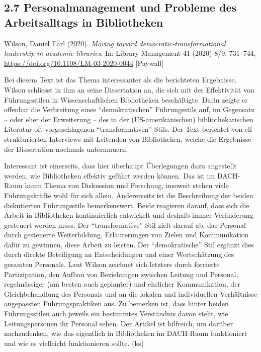 \documentclass[a4paper,
fontsize=11pt,
oneside,
numbers=noperiodatend,
parskip=half-,
bibliography=totoc,
final
]{scrartcl}
\begin{document}
\hypertarget{personalmanagement-und-probleme-des-arbeitsalltags-in-bibliotheken}{%
\subsection{2.7 Personalmanagement und Probleme des Arbeitsalltags in
Bibliotheken}\label{personalmanagement-und-probleme-des-arbeitsalltags-in-bibliotheken}}

Wilson, Daniel Earl (2020). \emph{Moving toward
democratic-transformational leadership in academic libraries}. In:
Library Management 41 (2020) 8/9, 731--744,
\url{https://doi.org/10.1108/LM-03-2020-0044} {[}Paywall{]}

Bei diesem Text ist das Thema interessanter als die berichteten
Ergebnisse. Wilson schliesst in ihm an seine Dissertation an, die sich
mit der Effektivität von Führungsstilen in Wissenschaftlichen
Bibliotheken beschäftigte. Darin zeigte er offenbar die Verbreitung
eines \enquote{demokratischen} Führungsstils auf, im Gegensatz -- oder
eher der Erweiterung -- des in der (US-amerikanischen)
bibliothekarischen Literatur oft vorgeschlagenen
\enquote{transformativen} Stils. Der Text berichtet von elf
strukturierten Interviews mit Leitenden von Bibliotheken, welche die
Ergebnisse der Dissertation nochmals untermauern.

Interessant ist einerseits, dass hier überhaupt Überlegungen dazu
angestellt werden, wie Bibliotheken effektiv geführt werden können. Das
ist im DACH-Raum kaum Thema von Diskussion und Forschung, insoweit
stehen viele Führungskräfte wohl für sich allein. Andererseits ist die
Beschreibung der beiden diskutierten Führungsstile bemerkenswert. Beide
reagieren darauf, dass sich die Arbeit in Bibliotheken kontinuierlich
entwickelt und deshalb immer Veränderung gesteuert werden muss. Der
\enquote{transformative} Stil zielt darauf ab, das Personal durch
gesteuerte Weiterbildung, Erläuterungen von Zielen und Kommunikation
dafür zu gewinnen, diese Arbeit zu leisten. Der \enquote{demokratische}
Stil ergänzt dies durch direkte Beteiligung an Entscheidungen und einer
Wertschätzung des gesamten Personals. Laut Wilson zeichnet sich letzters
durch forcierte Partizipation, den Aufbau von Beziehungen zwischen
Leitung und Personal, regelmässiger (am besten auch geplanter) und
ehrlicher Kommunikation, der Gleichbehandlung des Personals und an die
lokalen und individuellen Verhältnisse angepassten Führungspraktiken
aus. Zu bemerken ist, dass hinter beiden Führungsstilen auch jeweils ein
bestimmtes Verständnis davon steht, wie Leitungspersonen ihr Personal
sehen. Der Artikel ist hilfreich, um darüber nachzudenken, wie das
eigentlich in Bibliotheken im DACH-Raum funktioniert und wie es
vielleicht funktionieren sollte. (ks)
\end{document}
